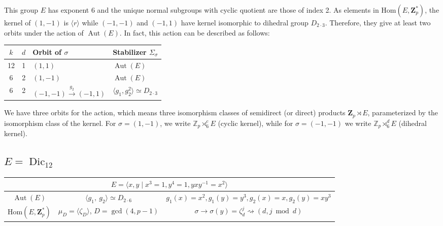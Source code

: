 \documentclass[12pt]{article}
\theoremstyle{definition}
\newcommand{\Z}{\mathbf Z}
\newcommand{\Hom}{\mathrm{Hom}}
\newcommand{\Aut}{\operatorname{Aut}}
\newcommand{\Dic}{\operatorname{Dic}}
\begin{document}
	This group $E$ has exponent $6$ and the unique normal subgroups with cyclic quotient are those of index 2. As elements in $\Hom(E,\Z_p^*)$, the kernel of 
	$(1,-1)$ is $\langle r\rangle$ while $(-1,-1)$ and $(-1,1)$ have kernel isomorphic to dihedral group $D_{2\cdot 3}$. Therefore, they give at least two orbits under the action of $\Aut(E)$.
    In fact, this action  can be described as follows:
	\begin{center}
		\begin{tabular}{c|c|l|l}
			$k$ & $ d$ & Orbit of $\sigma$& Stabilizer $\Sigma_{\sigma}$ \\
			\hline
			12 &1 & $(1,1)$   & $\Aut(E)$\\
			6&2 & $(1,-1)$   & $\Aut(E)$\\
			6&2 & $(-1,-1)\xrightarrow{g_2}(-1,1)$   & $\langle g_1,g_2^2\rangle\simeq D_{2\cdot 3}$\\
		\end{tabular}
	\end{center}

     We have three orbits for the action, which means three isomorphism classes of semidirect (or direct) products
	$\Z_p\rtimes E$, parameterized by the isomorphism class of the kernel. For $\sigma=(1,-1)$, we write $\mathbb{Z}_p\rtimes_6^c E$ (cyclic kernel), while for $\sigma=(-1,-1)$ we write $\mathbb{Z}_p\rtimes_6^d E$ (dihedral kernel).
	
	
	
	\subsection{$E=\Dic_{12}$}\label{dici}



     \begin{center}
    \begin{tabular}{|c|c|c|}
\multicolumn{3}{c}{$E=\langle x,y \mid x^3=1, y^4=1, yxy^{-1}=x^2\rangle$}\\[1ex]
\hline
$\Aut(E) $&$\langle g_1,\ g_2\rangle\simeq D_{2\cdot 6}$ &
	 $g_1(x)=x^2,g_1(y)=y^3,g_2(x)=x,g_2(y)=xy^3$\\[1ex] 
$\Hom(E,\Z_p^*)$ & $\mu_{D}=\langle \zeta_D\rangle$, $D=\gcd(4,p-1)$& $\sigma \to  \sigma(y)=\zeta_d^j\rightsquigarrow (d,j\bmod d)$\\
\hline
\end{tabular}
  \end{center} 
	
\end{document}
